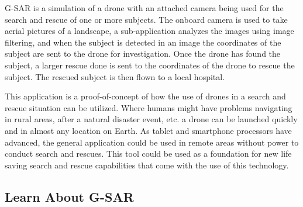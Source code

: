 G-\/\+S\+AR is a simulation of a drone with an attached camera being used for the search and rescue of one or more subjects. The onboard camera is used to take aerial pictures of a landscape, a sub-\/application analyzes the images using image filtering, and when the subject is detected in an image the coordinates of the subject are sent to the drone for investigation. Once the drone has found the subject, a larger rescue done is sent to the coordinates of the drone to rescue the subject. The rescued subject is then flown to a local hospital.

This application is a proof-\/of-\/concept of how the use of drones in a search and rescue situation can be utilized. Where humans might have problems navigating in rural areas, after a natural disaster event, etc. a drone can be launched quickly and in almost any location on Earth. As tablet and smartphone processors have advanced, the general application could be used in remote areas without power to conduct search and rescues. This tool could be used as a foundation for new life saving search and rescue capabilities that come with the use of this technology.

\subsection*{Learn About G-\/\+S\+AR}


